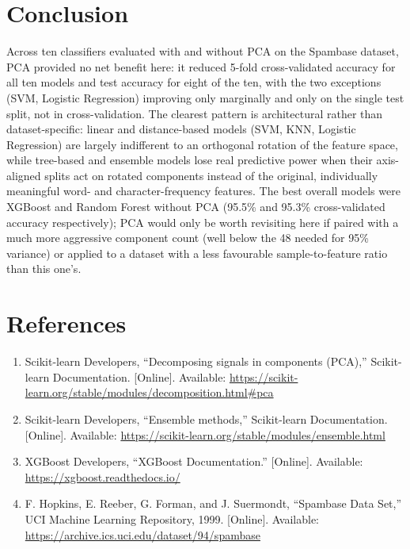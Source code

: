 \documentclass[12pt,a4paper]{article}
\begin{document}
\section{Conclusion}
Across ten classifiers evaluated with and without PCA on the Spambase dataset, PCA provided
no net benefit here: it reduced 5-fold cross-validated accuracy for all ten models and test
accuracy for eight of the ten, with the two exceptions (SVM, Logistic Regression) improving
only marginally and only on the single test split, not in cross-validation. The clearest
pattern is architectural rather than dataset-specific: linear and distance-based models
(SVM, KNN, Logistic Regression) are largely indifferent to an orthogonal rotation of the
feature space, while tree-based and ensemble models lose real predictive power when their
axis-aligned splits act on rotated components instead of the original, individually
meaningful word- and character-frequency features. The best overall models were XGBoost and
Random Forest without PCA (95.5\% and 95.3\% cross-validated accuracy respectively); PCA
would only be worth revisiting here if paired with a much more aggressive component count
(well below the 48 needed for 95\% variance) or applied to a dataset with a less favourable
sample-to-feature ratio than this one's.

\section{References}
\begin{enumerate}
\item Scikit-learn Developers, ``Decomposing signals in components (PCA),'' Scikit-learn
Documentation. [Online]. Available:
\url{https://scikit-learn.org/stable/modules/decomposition.html\#pca}
\item Scikit-learn Developers, ``Ensemble methods,'' Scikit-learn Documentation. [Online].
Available: \url{https://scikit-learn.org/stable/modules/ensemble.html}
\item XGBoost Developers, ``XGBoost Documentation.'' [Online]. Available:
\url{https://xgboost.readthedocs.io/}
\item F. Hopkins, E. Reeber, G. Forman, and J. Suermondt, ``Spambase Data Set,'' UCI Machine
Learning Repository, 1999. [Online]. Available:
\url{https://archive.ics.uci.edu/dataset/94/spambase}
\end{enumerate}
\end{document}
